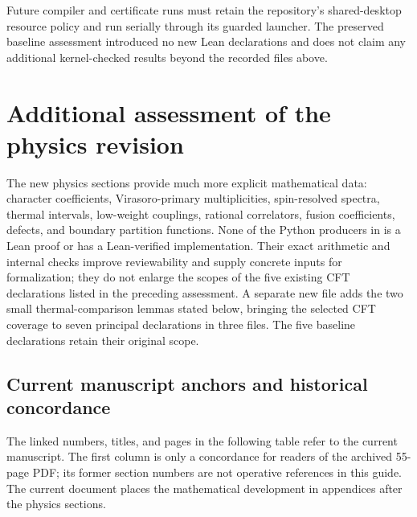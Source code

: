 Future compiler and certificate runs must retain the repository's
shared-desktop resource policy and run serially through its guarded
launcher. The preserved baseline assessment introduced no new Lean declarations and
does not claim any additional kernel-checked results beyond the
recorded files above.

\section{Additional assessment of the physics revision}
\label{sec:physics-lean-assessment}

The new physics sections provide much more explicit mathematical data:
character coefficients, Virasoro-primary multiplicities, spin-resolved
spectra, thermal intervals, low-weight couplings, rational correlators,
fusion coefficients, defects, and boundary partition functions. None
of the Python producers in  is a Lean
proof or has a Lean-verified implementation. Their exact arithmetic
and internal checks improve reviewability and supply concrete inputs
for formalization; they do not enlarge the scopes of the five existing
CFT declarations listed in the preceding assessment. A separate new
file adds the two small thermal-comparison lemmas stated below, bringing
the selected CFT coverage to seven principal declarations in three
files. The five baseline declarations retain their original scope.

\subsection{Current manuscript anchors and historical concordance}

The linked numbers, titles, and pages in the following table refer to
the current manuscript. The first column is only a concordance for
readers of the archived 55-page PDF; its former section numbers are
not operative references in this guide. The current document places
the mathematical development in appendices after the physics sections.

